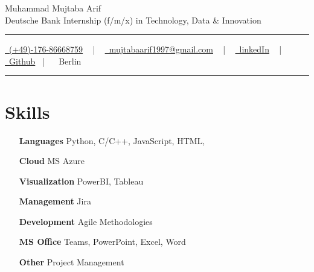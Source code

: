 \documentclass[letterpaper,10pt]{article}
\newcommand{\documentTitle}[2]{
  \begin{center}
    {\Huge\color{accentTitle} #1}
    \vspace{10pt}
    {\color{accentLine} \hrule}
    \vspace{2pt}
    \footnotesize{#2}
    \vspace{2pt}
    {\color{accentLine} \hrule}
  \end{center}
}
\begin{document}

\documentTitle{Muhammad Mujtaba Arif\\{\large
Deutsche Bank Internship (f/m/x) in Technology, Data \& Innovation
}}
{
\href{tel:1234567890}{
    \raisebox{-0.05\height} \faPhone\ (+49)-176-86668759} ~ | ~
\href{}{
    \raisebox{-0.15\height} \faEnvelope\ mujtabaarif1997@gmail.com} ~ | ~
\href{https://www.linkedin.com/in/muhammad-mujtaba-arif-0b2789192/}{
    \raisebox{-0.15\height} \faLinkedin\ linkedIn} ~ | ~
\href{https://github.com/Mujtaba-arif/Web-Development-Projects}{
    \raisebox{-0.15\height} \faGithub\ Github}~ | ~
\raisebox{-0.15\height} \ Berlin

}

\vspace{10pt}



\section{Skills}

\begin{multicols}{2}
    \begin{itemize}[itemsep=-2px, parsep=1pt, leftmargin=75pt]
        \item[\textbf{Languages}] Python, C/C++, JavaScript, HTML,
        \item[\textbf{Cloud}] MS Azure
        \item[\textbf{Visualization}] PowerBI, Tableau

        \item[\textbf{Management}] Jira
        \item[\textbf{Development}] Agile Methodologies
        \item[\textbf{MS Office}] Teams, PowerPoint,  Excel, Word
        \item[\textbf{Other}] Project Management

    \end{itemize}
\end{multicols}
\end{document}
